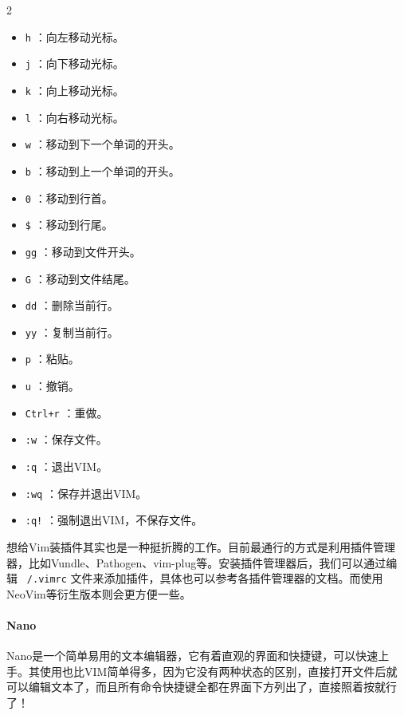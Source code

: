 \begin{multicols}{2}
  \begin{itemize}
    \item  \texttt{h} ：向左移动光标。
    \item  \texttt{j} ：向下移动光标。
    \item  \texttt{k} ：向上移动光标。
    \item  \texttt{l} ：向右移动光标。
    \item  \texttt{w} ：移动到下一个单词的开头。
    \item  \texttt{b} ：移动到上一个单词的开头。
    \item  \texttt{0} ：移动到行首。
    \item  \texttt{\$} ：移动到行尾。
    \item  \texttt{gg} ：移动到文件开头。
    \item  \texttt{G} ：移动到文件结尾。
    \item  \texttt{dd} ：删除当前行。
    \item  \texttt{yy} ：复制当前行。
    \item  \texttt{p} ：粘贴。
    \item  \texttt{u} ：撤销。
    \item  \texttt{Ctrl+r} ：重做。
    \item  \texttt{:w} ：保存文件。
    \item  \texttt{:q} ：退出VIM。
    \item  \texttt{:wq} ：保存并退出VIM。
    \item  \texttt{:q!} ：强制退出VIM，不保存文件。
  \end{itemize}
\end{multicols}

想给Vim装插件其实也是一种挺折腾的工作。目前最通行的方式是利用插件管理器，比如Vundle、Pathogen、vim-plug等。安装插件管理器后，我们可以通过编辑 \texttt{~/.vimrc} 文件来添加插件，具体也可以参考各插件管理器的文档。而使用NeoVim等衍生版本则会更方便一些。

\paragraph{Nano}

Nano是一个简单易用的文本编辑器，它有着直观的界面和快捷键，可以快速上手。其使用也比VIM简单得多，因为它没有两种状态的区别，直接打开文件后就可以编辑文本了，而且所有命令快捷键全都在界面下方列出了，直接照着按就行了！

